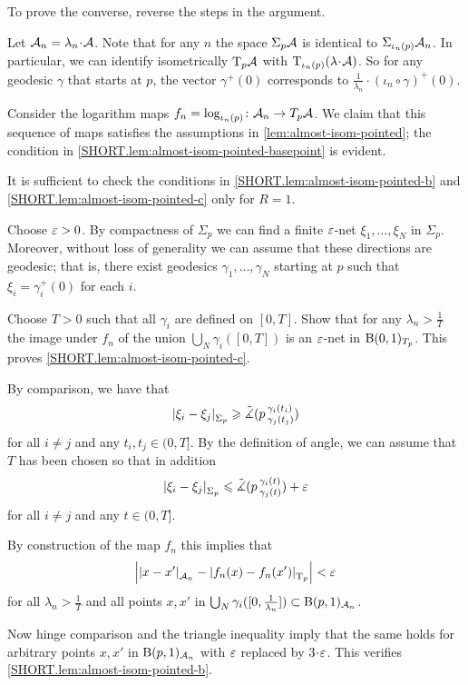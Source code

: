 To prove the converse, reverse the steps in the argument.

Let  $\spc{A}_n=\lambda_n\cdot\spc{A}$.
Note that for any $n$ the space $\Sigma_p\mathcal{A}$ is identical to $\Sigma_{\iota_n(p)} \mathcal{A}_n$.
In particular, we can identify isometrically $\mathrm{T}_p\mathcal{A}$ with $\T_{\iota_n(p)}(\lambda\cdot \spc{A})$.
So for any geodesic $\gamma$ that starts at $p$, the vector $\gamma^+(0)$ corresponds to $\frac{1}{\lambda_n}\cdot(\iota_n\circ\gamma)^+(0)$.

Consider the logarithm maps $f_n=\log_{\iota_n(p)}\colon\mathcal{A}_n\to T_p\mathcal{A}$.
We claim that this sequence of maps satisfies the assumptions in \ref{lem:almost-isom-pointed};
the condition in \ref{SHORT.lem:almost-isom-pointed-basepoint} is evident.  

It is sufficient to check the conditions in \ref{SHORT.lem:almost-isom-pointed-b} and \ref{SHORT.lem:almost-isom-pointed-c} only for $R=1$. 

Choose $\varepsilon>0$.
By compactness of $\Sigma_p$ we can find a finite $\varepsilon$-net $\xi_1,\dots,\xi_N$ in $\Sigma_p$. Moreover, without loss of generality we can assume that these directions are geodesic;
that is, there exist geodesics $\gamma_1,\ldots, \gamma_N$ starting at $p$ such that $\xi_i=\gamma_i^+(0)$ for each $i$.

Choose $T>0$ such that all $\gamma_i$ are defined on $[0,T]$.
Show that for any $\lambda_n>\frac{1}{T}$ the image under $f_n$ of the union $\bigcup_N\gamma_i([0,T])$ is an $\varepsilon$-net in $\mathrm{B}{}(0,1)_{T_p}$.
This proves \ref{SHORT.lem:almost-isom-pointed-c}.

By comparison, we have that
\[|{\xi_i}-{\xi_j}|_{\Sigma_p}^{{}}\geqslant \tilde\measuredangle(p\,{}^{\gamma_i(t_i)}_{\gamma_j(t_j)})\]
for all $i\ne j$ and any $t_i,t_j\in (0,T]$.
By the definition of angle, we can assume that $T$ has been chosen so that in addition
\[|{\xi_i}-{\xi_j}|_{\Sigma_p}^{{}}\leqslant \tilde\measuredangle(p\,{}^{\gamma_i(t)}_{\gamma_j(t)})+\varepsilon\]
for all $i\ne j$ and any $t\in (0,T]$.

By construction of the map $f_n$ this implies that 
\[\left||{x}-{x'}|_{\mathcal{A}_n}^{{}}-|{f_n(x)}-{f_n(x')}|_{\mathrm{T}_p}^{{}}\right|<\varepsilon\]
for all $\lambda_n>\frac{1}{T}$ and all points $x,x'$ in $\bigcup_N\gamma_i([0,\frac{1}{\lambda_n}])\subset \mathrm{B}{}(p,1)_{\mathcal{A}_n}$.
  
Now hinge comparison and the triangle inequality imply that the same  holds for arbitrary points $x,x'$  in  $\mathrm{B}{}(p,1)_{\mathcal{A}_n}$ with $\varepsilon$ replaced by $3\cdot\eps$.
This verifies \ref{SHORT.lem:almost-isom-pointed-b}.


